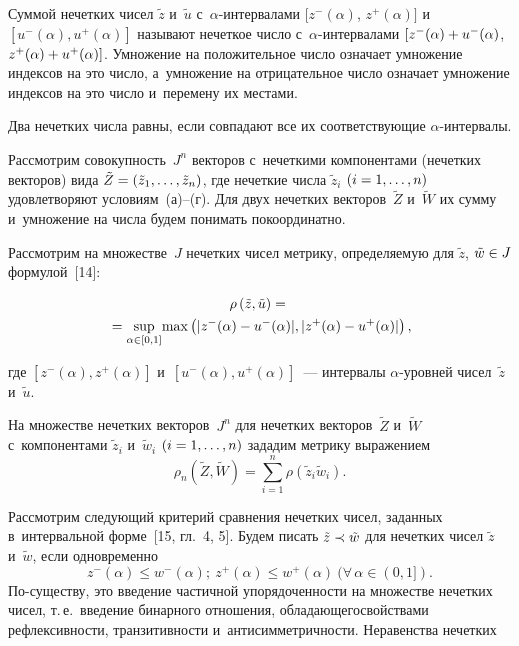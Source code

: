 \begin{multicols}{2}
Суммой нечетких чисел $\tilde{z}$ и~$\tilde{u}$ с~$\alpha$-ин\-тер\-ва\-ла\-ми $[z^{-}(\alpha)$, 
$z^{+}(\alpha)]$  и~$[u^{-}(\alpha), u^{+}(\alpha)]$ называют нечеткое 
чис\-ло с~$\alpha$-ин\-тер\-ва\-ла\-ми $[z^{-}(\alpha)\hm+u^{-}(\alpha)$, 
$z^{+}(\alpha)\hm+u^{+}(\alpha)]$. Умножение на положительное чис\-ло означает 
умножение индексов на это чис\-ло, а~умножение на отрицательное чис\-ло означает 
умножение индексов на это чис\-ло и~перемену их местами.

Два нечетких чис\-ла равны, если совпадают все их соответствующие $\alpha$-ин\-тер\-валы.

Рассмотрим совокупность~$J^n$ векторов с~нечеткими компонентами (нечетких 
векторов) вида $\tilde{Z} \hm= (\tilde{z}_1,\ldots, \tilde{z}_n)$, где нечеткие чис\-ла 
$\tilde{z}_i$ $(i\hm=1,\ldots,n)$ удовлетворяют условиям~(а)--(г). Для двух нечетких 
векторов~$\tilde{Z}$ и~$\tilde{W}$ их сумму и~умножение на чис\-ла будем понимать 
покоординатно.

Рассмотрим  на множестве~$J$ нечетких чисел мет\-ри\-ку, определяемую для 
$\tilde{z}$, $\tilde{w}\hm\in J$ формулой~[14]:


\noindent
\begin{multline*}
\rho\left(\tilde{z}, \tilde{u}\right) ={}\\
{}= \sup\limits_{\alpha\in[0, 1]}\!\max\left(|z^{-}
(\alpha) \hm- u^{-}(\alpha)|, |z^{+}(\alpha) \hm- u^{+}(\alpha)| \right),
\end{multline*}


\noindent
где $[z^{-}(\alpha), z^{+}(\alpha)]$ и~$[u^{-}(\alpha), u^{+}(\alpha)]$~---
интервалы \mbox{$\alpha$-уров}\-ней чисел~$\tilde{z}$ и~$\tilde{u}$.

На множестве нечетких векторов~$J^n$ для нечетких векторов~$\tilde{Z}$ 
и~$\tilde{W}$ с~компонентами $\tilde{z}_i$ и~$\tilde{w}_i$ $(i\hm=1,\ldots,n)$ 
зададим метрику выражением
$$
\rho_n\left(\tilde{Z}, \tilde{W}\right) = \sum\limits_{i=1}^n\rho\left(\tilde{z}_i \tilde{w}_i\right).
$$


Рассмотрим следующий критерий сравнения нечетких чисел, заданных в~интервальной 
форме~[15, гл.~4, 5]. Будем писать $\tilde{z}\hm\prec\tilde{w}$ для нечетких 
чисел $\tilde{z}$ и~$\tilde{w}$, если одновременно
\begin{equation}
z^{-}(\alpha)\leq w^{-}(\alpha); \ z^{+}(\alpha)\leq 
w^{+}(\alpha)\ (\forall\,\alpha\in (0,1]).
\label{e1-h}
\end{equation}
%
По-существу, это введение частичной упо\-ря\-до\-чен\-ности на множестве нечетких чисел, 
т.\,е.\ введение бинарного отношения, обладающего\linebreak свойствами реф\-лек\-сив\-ности, 
тран\-зи\-тив\-ности и~\mbox{ан\-ти\-сим\-мет\-рич\-ности}. Неравенства нечетких\linebreak\vspace*{-12pt}


\end{multicols}
